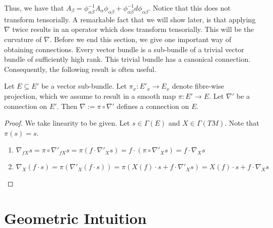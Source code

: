 Thus, we have that $A_\beta=\phi_{\alpha\beta}^{-1}A_\alpha \phi_{\alpha\beta}+\phi_{\alpha\beta}^{-1}d\phi_{\alpha\beta}$. Notice that this does not transform tensorially. A remarkable fact that we will show later, is that applying $\nabla$ twice results in an operator which does transform tensorially. This will be the curvature of $\nabla$. Before we end this section, we give one important way of obtaining connections. Every vector bundle is a sub-bundle of a trivial vector bundle of sufficiently high rank. This trivial bundle has a canonical connection. Consequently, the following result is often useful.
\begin{proposition}\label{projection}
  Let $E\subseteq E'$ be a vector sub-bundle. Let $\pi_x:E'_x\to E_x$ denote fibre-wise projection, which we assume to result in a smooth map $\pi:E'\to E$. Let $\nabla'$ be a connection on $E'$. Then $\nabla:=\pi\circ\nabla'$ defines a connection on $E$.
\end{proposition}
\begin{proof}
  We take linearity to be given. Let $s\in\Gamma(E)$ and $X\in\Gamma(TM)$. Note that $\pi(s)=s$.
  \begin{enumerate}
    \item $\nabla_{fX}s=\pi\circ\nabla'_{fX}s=\pi(f\cdot\nabla'_Xs)=f\cdot(\pi\circ\nabla'_Xs)=f\cdot\nabla_Xs$
    \item $\nabla_X(f\cdot s)=\pi(\nabla'_X(f\cdot s))=\pi(X(f)\cdot s+f\cdot\nabla'_Xs)=X(f)\cdot s+f\cdot\nabla_Xs$
  \end{enumerate}
\end{proof}

\section{Geometric Intuition}

